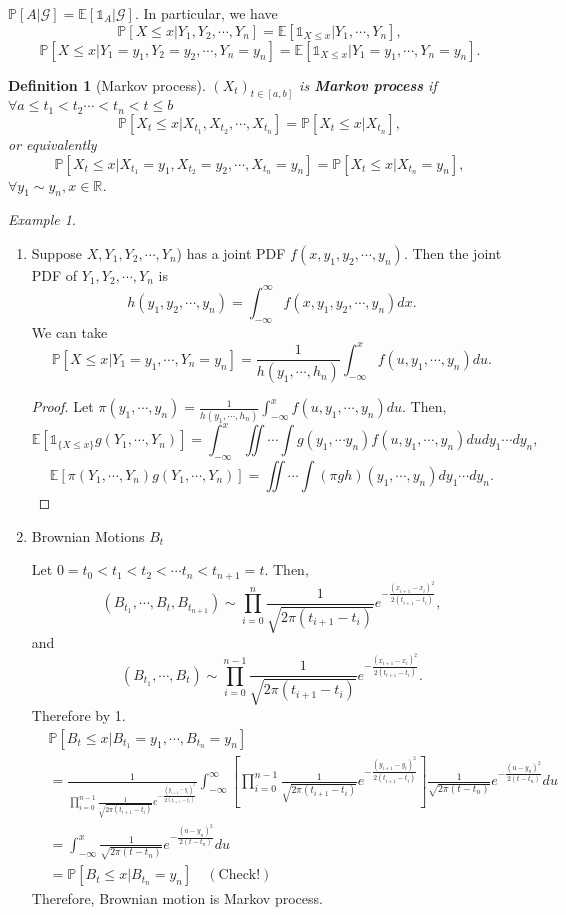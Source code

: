\documentclass[12pt]{report}
\newcommand{\R}{\mathbb{R}}
\renewcommand{\P}{\mathbb{P}}
\newcommand{\G}{\mathcal{G}}
\newcommand{\E}{\mathbb{E}}
\renewcommand{\1}{\mathbb{1}}
\theoremstyle{break}
\theoremstyle{newdef}
\newtheorem{defn}[thm]{Definition} %
\theoremstyle{remark}
\newtheorem*{exmp}{Example} %
\begin{document}
$\P[A|\G] = \E[\1_A | \G]$.
In particular, we have
\[\P [X \leq x | Y_1, Y_2, \cdots, Y_n] = \E[\1_{X\leq x} | Y_1, \cdots, Y_n],\]
\[\P [X \leq x | Y_1 = y_1, Y_2 = y_2, \cdots, Y_n = y_n] = \E[\1_{X\leq x} | Y_1 = y_1, \cdots, Y_n = y_n].\]



\begin{defn}[Markov process]
$(X_t)_{t\in[a,b]}$ is \textbf{Markov process} if $\forall a \leq t_1 < t_2 \cdots < t_n < t \leq b$
\[\P\left[X_t \leq x | X_{t_1}, X_{t_2}, \cdots, X_{t_n}\right] = \P[X_t \leq x | X_{t_n}],\]
or equivalently
\[\P\left[X_t \leq x | X_{t_1} = y_1, X_{t_2} = y_2, \cdots, X_{t_n} = y_n\right] = \P[X_t \leq x | X_{t_n} = y_n],\]
$\forall y_1 \sim y_n, x \in \R$.
\end{defn}

\begin{exmp}
\leavevmode
\begin{enumerate}[wide]
\item
Suppose $X, Y_1, Y_2, \cdots, Y_n$) has a joint PDF $f(x,y_1, y_2, \cdots, y_n)$.
Then the joint PDF of $Y_1, Y_2, \cdots, Y_n$ is
\[h(y_1, y_2, \cdots, y_n) = \int_{-\infty}^\infty f(x,y_1, y_2, \cdots, y_n)dx.\]
We can take
\[\P[X \leq x | Y_1 = y_1, \cdots, Y_n = y_n] = \frac{1}{h(y_1,\cdots,h_n)}\int_{-\infty}^x f(u,y_1,\cdots,y_n)du.\]
\begin{proof}
Let $\pi(y_1,\cdots,y_n) = \frac{1}{h(y_1,\cdots,h_n)}\int_{-\infty}^x f(u,y_1,\cdots,y_n)du.$
Then, \[\E[\1_{\{X \leq x\}} g(Y_1, \cdots, Y_n)] = \int_{-\infty}^x \iint\cdots\int g(y_1,\cdots y_n) f(u,y_1,\cdots,y_n)dudy_1\cdots dy_n,\]
\[\E[\pi(Y_1, \cdots, Y_n)g(Y_1,\cdots, Y_n)] = \iint\cdots\int (\pi g h)(y_1,\cdots,y_n)dy_1\cdots dy_n.\]
\end{proof}

\item Brownian Motions $B_t$

Let $0 = t_0 < t_1 < t_2 < \cdots t_n < t_{n+1} = t$.
Then,
\[
(B_{t_1}, \cdots, B_t, B_{t_{n+1}}) \sim \prod_{i=0}^n \frac{1}{\sqrt{2\pi(t_{i+1}-t_i)}} e^{-\frac{(x_{i+1}-x_i)^2}{2(t_{i+1}-t_i)}},
\]
and
\[(B_{t_1}, \cdots, B_t) \sim \prod_{i=0}^{n-1} \frac{1}{\sqrt{2\pi(t_{i+1}-t_i)}} e^{-\frac{(x_{i+1}-x_i)^2}{2(t_{i+1}-t_i)}}.\]
Therefore by 1.
\[
\begin{aligned}
&\P[B_t \leq x | B_{t_1} = y_1, \cdots, B_{t_n} = y_n]\\
&= \frac{1}{\prod_{i=0}^{n-1} \frac{1}{\sqrt{2\pi(t_{i+1}-t_i)}} e^{-\frac{(y_{i+1}-y_i)^2}{2(t_{i+1}-t_i)}}}
\int_{-\infty}^\infty \left[ {\prod_{i=0}^{n-1} \frac{1}{\sqrt{2\pi(t_{i+1}-t_i)}} e^{-\frac{(y_{i+1}-y_i)^2}{2(t_{i+1}-t_i)}}} \right]
\frac{1}{\sqrt{2\pi(t-t_n)}} e^{-\frac{(u-y_n)^2}{2(t-t_n)}}du\\
&= \int_{-\infty}^x \frac{1}{\sqrt{2\pi(t-t_n)}} e^{-\frac{(u-y_n)^2}{2(t-t_n)}}du\\
&= \P\left[ B_t \leq x | B_{t_n} = y_n\right] \quad (\text{Check!})
\end{aligned}
\]
Therefore, Brownian motion is Markov process.
\end{enumerate}
\end{exmp}
\end{document}
